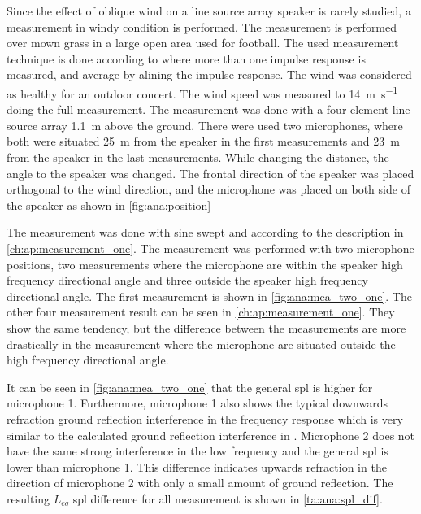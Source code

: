 Since the effect of oblique wind on a line source array speaker is rarely studied, a measurement in windy condition is performed. The measurement is performed over mown grass in a large open area used for football. The used measurement technique is done according to \citep{gunness2001loudspeaker} where more than one impulse response is measured, and average by alining the impulse response. The wind was considered as healthy for an outdoor concert. The wind speed was measured to  \SI{14}{\meter\per\second} doing the full measurement. The measurement was done with a four element line source array \SI{1.1}{\meter} above the ground. There were used two microphones, where both were situated \SI{25}{\meter} from the speaker in the first measurements and \SI{23}{\meter} from the speaker in the last measurements. While changing the distance, the angle to the speaker was changed.  The frontal direction of the speaker was placed orthogonal to the wind direction, and the microphone was placed on both side of the speaker as shown in \autoref{fig:ana:position}



The measurement was done with sine swept and according to the description in \autoref{ch:ap:measurement_one}. The measurement was performed with two microphone positions, two measurements where the microphone are within the speaker high frequency directional angle and three outside the speaker high frequency directional angle. The first measurement is shown in \autoref{fig:ana:mea_two_one}. The other four measurement result can be seen in \autoref{ch:ap:measurement_one}. They show the same tendency, but the difference between the measurements are more drastically in the measurement where the microphone are situated outside the high frequency directional angle. 



It can be seen in \autoref{fig:ana:mea_two_one} that the general \gls{spl} is higher for microphone 1. Furthermore, microphone 1 also shows the typical downwards refraction ground reflection interference in the frequency response which is very similar to the calculated ground reflection interference in \citep{review_of_sound}.  Microphone 2 does not have the same strong interference in the low frequency and the general \gls{spl} is lower than microphone 1. This difference indicates upwards refraction in the direction of microphone 2 with only a small amount of ground reflection.  The resulting $L_{eq}$ \gls{spl} difference for all measurement is shown in \autoref{ta:ana:spl_dif}.

